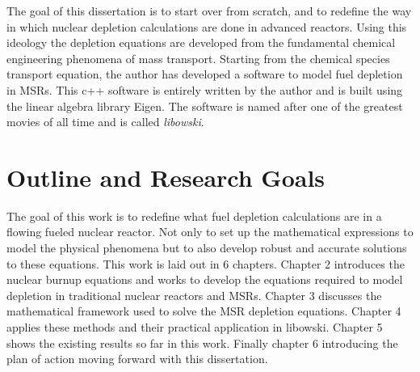 The goal of this dissertation is to start over from scratch, and to redefine the way in which nuclear depletion calculations are done in advanced reactors. Using this ideology the depletion equations are developed from the fundamental chemical engineering phenomena of mass transport. Starting from the chemical species transport equation, the author has developed a software to model fuel depletion in MSRs. This c++ software is entirely written by the author and is built using the linear algebra library Eigen. The software is named after one of the greatest movies of all time and is called \textit{libowski}.

\section{Outline and Research Goals}

The goal of this work is to redefine what fuel depletion calculations are in a flowing fueled nuclear reactor. Not only to set up the mathematical expressions to model the physical phenomena but to also develop robust and accurate solutions to these equations. This work is laid out in 6 chapters. Chapter 2 introduces the nuclear burnup equations and works to develop the equations required to model depletion in traditional nuclear reactors and MSRs. Chapter 3 discusses the mathematical framework used to solve the MSR depletion equations. Chapter 4 applies these methods  and their practical application in libowski. Chapter 5 shows the existing results so far in this work. Finally chapter 6 introducing the plan of action moving forward with this dissertation. 
